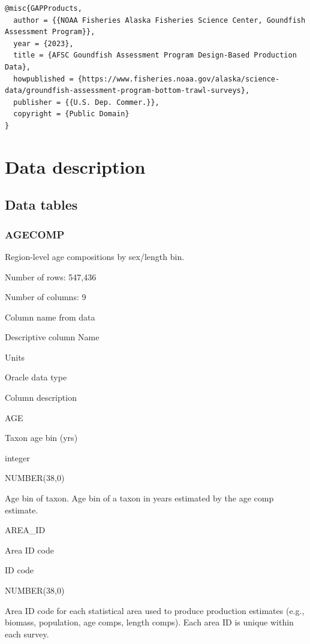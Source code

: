 \documentclass[
  letterpaper,
  oneside,
  open=any]{scrbook}
\begin{document}
\begin{verbatim}
@misc{GAPProducts,
  author = {{NOAA Fisheries Alaska Fisheries Science Center, Goundfish Assessment Program}},
  year = {2023}, 
  title = {AFSC Goundfish Assessment Program Design-Based Production Data},
  howpublished = {https://www.fisheries.noaa.gov/alaska/science-data/groundfish-assessment-program-bottom-trawl-surveys},
  publisher = {{U.S. Dep. Commer.}},
  copyright = {Public Domain} 
}
\end{verbatim}

\hypertarget{data-description-1}{%
\chapter{Data description}\label{data-description-1}}

\hypertarget{data-tables}{%
\section{Data tables}\label{data-tables}}

\hypertarget{agecomp}{%
\subsection{AGECOMP}\label{agecomp}}

Region-level age compositions by sex/length bin.

Number of rows: 547,436

Number of columns: 9

Column name from data

Descriptive column Name

Units

Oracle data type

Column description

AGE

Taxon age bin (yrs)

integer

NUMBER(38,0)

Age bin of taxon. Age bin of a taxon in years estimated by the age comp
estimate.

AREA\_ID

Area ID code

ID code

NUMBER(38,0)

Area ID code for each statistical area used to produce production
estimates (e.g., biomass, population, age comps, length comps). Each
area ID is unique within each survey.
\end{document}
